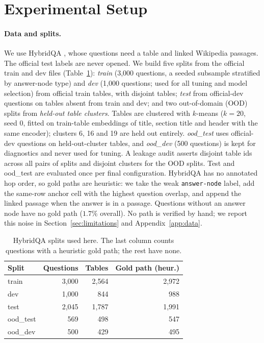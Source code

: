 \section{Experimental Setup}
\label{sec:setup}

\paragraph{Data and splits.}
We use HybridQA \citep{chen2020hybridqa}, whose questions need a table and linked Wikipedia passages.
The official test labels are never opened.
We build five splits from the official train and dev files (Table~\ref{tab:splits}): \emph{train} (3{,}000 questions, a seeded subsample stratified by answer-node type) and \emph{dev} (1{,}000 questions; used for all tuning and model selection) from official train tables, with disjoint tables; \emph{test} from official-dev questions on tables absent from train and dev; and two out-of-domain (OOD) splits from \emph{held-out table clusters}.
Tables are clustered with $k$-means ($k=20$, seed 0, fitted on train-table embeddings of title, section title and header with the same encoder); clusters 6, 16 and 19 are held out entirely.
\emph{ood\_test} uses official-dev questions on held-out-cluster tables, and \emph{ood\_dev} (500 questions) is kept for diagnostics and never used for tuning.
A leakage audit asserts disjoint table ids across all pairs of splits and disjoint clusters for the OOD splits.
Test and ood\_test are evaluated once per final configuration.
HybridQA has no annotated hop order, so gold paths are heuristic: we take the weak \texttt{answer-node} label, add the same-row anchor cell with the highest question overlap, and append the linked passage when the answer is in a passage.
Questions without an answer node have no gold path ($1.7\%$ overall).
No path is verified by hand; we report this noise in Section~\ref{sec:limitations} and Appendix~\ref{app:data}.

\begin{table}[t]
\centering\small
\begin{tabular}{@{}lrrr@{}}
\toprule
Split & Questions & Tables & Gold path (heur.) \\
\midrule
train & 3{,}000 & 2{,}564 & 2{,}972 \\
dev & 1{,}000 & 844 & 988 \\
test & 2{,}045 & 1{,}787 & 1{,}991 \\
ood\_test & 569 & 498 & 547 \\
ood\_dev & 500 & 429 & 495 \\
\bottomrule
\end{tabular}
\caption{HybridQA splits used here. The last column counts questions with a heuristic gold path; the rest have none.}
\label{tab:splits}
\end{table}

